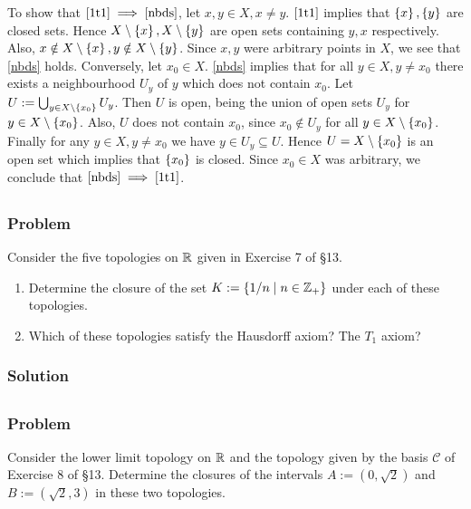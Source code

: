 To show that $\ref{1t1} \implies \ref{nbds}$, let $x,y \in X, x \neq y$. $\ref{1t1}$ implies that $\left\{ x \right\}, \left\{ y \right\}$ are closed sets. Hence $X\setminus\left\{ x \right\}, X\setminus\left\{ y \right\}$ are open sets containing $y, x$ respectively. Also, $x \notin X\setminus\left\{ x \right\}, y \notin X\setminus\left\{ y \right\}$. Since $x, y$ were arbitrary points in $X$, we see that \ref{nbds} holds. Conversely, let $x_0 \in X$. \ref{nbds} implies that for all $y \in X, y \neq x_0$ there exists a neighbourhood $U_y$ of $y$ which does not contain $x_0$. Let $U := \bigcup_{y \in X\setminus\left\{ x_0 \right\}}U_y$. Then $U$ is open, being the union of open sets $U_y$ for $y \in X\setminus\left\{ x_0 \right\}$. Also, $U$ does not contain $x_0$, since $x_0 \notin U_y$ for all $y \in X\setminus\left\{ x_0 \right\}$. Finally for any $y \in X, y \neq x_0$ we have $y \in U_y \subseteq U$. Hence $U = X\setminus\left\{ x_0 \right\}$ is an open set which implies that $\left\{ x_0 \right\}$ is closed. Since $x_0 \in X$ was arbitrary, we conclude that $\ref{nbds} \implies \ref{1t1}$. 


\setcounter{subsection}{15} %
\subsection{}

\subsubsection{Problem}
Consider the five topologies on $\mathbb R$ given in Exercise 7 of \S 13.
\begin{enumerate}
    \item Determine the closure of the set $K := \{ 1/n \mid n \in \mathbb Z_+ \}$ under each of these topologies.
    \item Which of these topologies satisfy the Hausdorff axiom? The $T_1$ axiom?
\end{enumerate}
\subsubsection{Solution}
\todo


\setcounter{subsection}{16} %
\subsection{}

\subsubsection{Problem}
Consider the lower limit topology on $\mathbb R$ and the topology given by the basis $\mathcal{C}$ of Exercise 8 of \S 13. Determine the closures of the intervals $A := (0, \sqrt{2})$ and $B := (\sqrt{2}, 3)$ in these two topologies.
